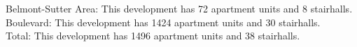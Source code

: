 {Belmont-Sutter Area}: This development has 72 apartment units and 8 stairhalls.\\{Boulevard}: This development has 1424 apartment units and 30 stairhalls.\\{Total}: This development has 1496 apartment units and 38 stairhalls.\\